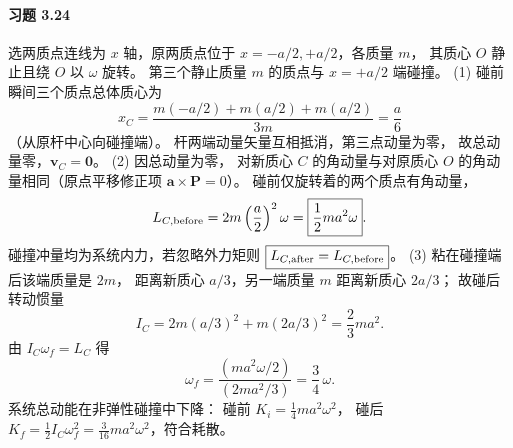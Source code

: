 \paragraph{习题 3.24}
选两质点连线为 \(x\) 轴，原两质点位于
\(x=-a/2,+a/2\)，各质量 \(m\)，
其质心 \(O\) 静止且绕 \(O\) 以 \(\omega\) 旋转。
第三个静止质量 \(m\) 的质点与 \(x=+a/2\) 端碰撞。
(1) 碰前瞬间三个质点总体质心为
\[
 x_C=\frac{m(-a/2)+m(a/2)+m(a/2)}{3m}
 =\boxed{\frac a6}
\]
（从原杆中心向碰撞端）。
杆两端动量矢量互相抵消，第三点动量为零，
故总动量零，\(\boxed{\boldsymbol v_C=\boldsymbol0}\)。
(2) 因总动量为零，
对新质心 \(C\) 的角动量与对原质心 \(O\)
的角动量相同（原点平移修正项
\(\boldsymbol a\times\boldsymbol P=0\)）。
碰前仅旋转着的两个质点有角动量，
\[
 L_{C,\rm before}
 =2m\left(\frac a2\right)^2\omega
 =\boxed{\frac12ma^2\omega}.
\]
碰撞冲量均为系统内力，若忽略外力矩则
\(\boxed{L_{C,\rm after}=L_{C,\rm before}}\)。
(3) 粘在碰撞端后该端质量是 \(2m\)，
距离新质心 \(a/3\)，另一端质量 \(m\)
距离新质心 \(2a/3\)；
故碰后转动惯量
\[
 I_C=2m(a/3)^2+m(2a/3)^2=\frac23ma^2.
\]
由 \(I_C\omega_f=L_C\) 得
\[
 \boxed{\omega_f=\frac{(ma^2\omega/2)}{(2ma^2/3)}
 =\frac34\,\omega}.
\]
系统总动能在非弹性碰撞中下降：
碰前 \(K_i=\frac14ma^2\omega^2\)，
碰后 \(K_f=\frac12I_C\omega_f^2
 =\frac3{16}ma^2\omega^2\)，符合耗散。
